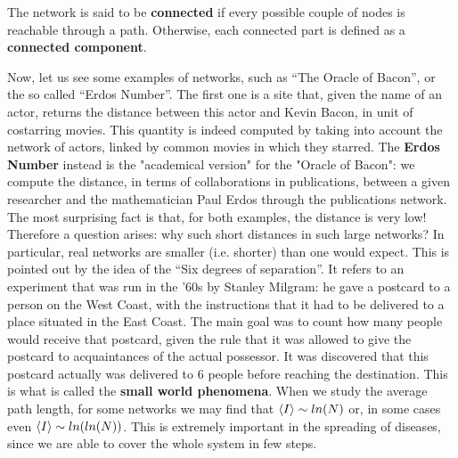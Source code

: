 \documentclass[../main/main.tex]{subfiles}
\begin{document}
The network is said to be \textbf{connected} if every possible couple of nodes is reachable through a path. Otherwise, each connected part is defined as a \textbf{connected component}.



Now, let us see some examples of networks, such as “The Oracle of Bacon”, or the so called “Erdos Number”. The first one is a site that, given the name of an actor, returns the distance between this actor and Kevin Bacon,  in unit of costarring movies. This quantity is indeed computed by taking into account the network of actors, linked by common movies in which they starred. The \textbf{Erdos Number} instead is the "academical version" for the "Oracle of Bacon": we compute the distance, in terms of collaborations in publications, between a given researcher and the mathematician Paul Erdos through the publications network. The most surprising fact is that, for both examples, the distance is very low! Therefore a question arises: why such short distances in such large networks?
In particular, real networks are smaller (i.e. shorter) than one would expect. This is pointed out by the idea of the “Six degrees of separation”. It refers to an experiment that was run in the '60s by Stanley Milgram: he gave a postcard to a person on the West Coast, with the instructions that it had to be delivered to a place situated in the East Coast. The main goal was to count how many people would receive that postcard, given the rule that it was allowed to give the postcard to acquaintances of the actual possessor. It was discovered that this postcard actually was delivered to 6 people before reaching the destination.
This is what is called the \textbf{small world phenomena}. When we study the average path length, for some networks we may find that $\expval{I} \sim ln(N)$ or, in some cases even $\expval{I} \sim ln(ln(N))$. This is extremely important in the spreading of diseases, since we are able to cover the whole system in few steps.
\end{document}
